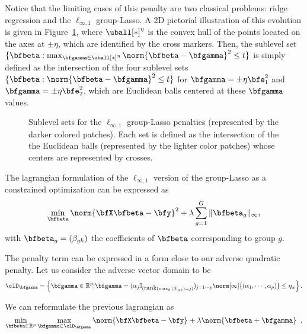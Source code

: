 Notice that the limiting cases of this penalty are two classical problems: ridge
regression and the $\ell_{\infty,1}$ group-Lasso.
A 2D pictorial illustration of this evolution is given in
Figure~\ref{fig:group-penalty}, where $\uball[*]^\eta$ is the convex hull of the
points located on the axes at $\pm \eta$, which are identified by the cross
markers.
Then, the sublevel set 
$\{\bfbeta : \max_{\bfgamma \in \uball[*]^\eta} \norm{\bfbeta-\bfgamma}^2 \leq t\}$
is simply defined as the intersection of the four sublevel sets
$\{\bfbeta : \norm{\bfbeta - \bfgamma}^2 \leq t\}$ for 
$\bfgamma=\pm \eta\bfe^{2}_1$ and $\bfgamma=\pm \eta\bfe^{2}_2$,
which are Euclidean balls centered at these $\bfgamma$ values.
%
\begin{figure}
  \begin{center} 
    \caption{Sublevel sets for the $\ell_{\infty,1}$ group-Lasso penalties
             (represented by the darker colored patches).
             Each set is defined as the intersection of the the Euclidean balls
             (represented by the lighter color patches) whose centers are
             represented by crosses.}
    \label{fig:group-penalty}
    \end{center} 
\end{figure}

\iffalse
The  lagrangian formulation  of the  $\ell_{\infty,1}$ version  of the
group-Lasso as a constrained optimization can be expressed as
$$
 \min_{\bfbeta}     \norm{\bfX  \bfbeta  - \bfy  }^2+\lambda \sum_{g=1}^G \|\bfbeta_g\|_\infty,
$$
with $\bfbeta_g=(\beta_{gk})$ the coefficients of $\bfbeta$ corresponding to group $g$.


The penalty term can be expressed in a form close to our adverse quadratic penalty. Let us consider  the adverse vector domain to be
$$
 \clD_{\bfgamma}=\left\{ \bfgamma \in \mathbb{R}^p | \bfgamma= 
(\alpha_j \mathbb{I}_{(\mbox{rank}\left(  \max_k |\beta|_{gk}\right)=j) })_{j=1
      \cdots p } 
\norm[\infty]{(\alpha_1,\cdots,\alpha_p)} \leq \eta_\alpha \right\} .
$$

We can reformulate the previous lagrangian as 
\begin{equation}
    \min_{\bfbeta\in\mathbb{R}^p} \max_{\bfgamma \in \clD_{\bfgamma}}
    \norm{\bfX \bfbeta - \bfy } + \lambda \norm{\bfbeta +
    \bfgamma } \enspace.
\end{equation}

